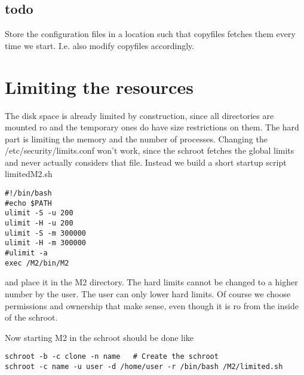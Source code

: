 \documentclass[a4paper]{book}
\begin{document}
\subsection{todo}

Store the configuration files in a location such that copyfiles fetches them
every time we start. I.e. also modify copyfiles accordingly.


\section{Limiting the resources}

The disk space is already limited by construction, since all directories are
mounted ro and the temporary ones do have size restrictions on them.  The hard
part is limiting the memory and the number of processes.  Changing the
/etc/security/limits.conf won't work, since the schroot fetches the global
limits and never actually considers that file.  Instead we build a short
startup script limitedM2.sh

\begin{verbatim}
#!/bin/bash
#echo $PATH
ulimit -S -u 200
ulimit -H -u 200
ulimit -S -m 300000
ulimit -H -m 300000
#ulimit -a
exec /M2/bin/M2
\end{verbatim}

and place it in the M2 directory. The hard limits cannot be changed to a higher
number by the user. The user can only lower hard limits. Of course we choose
permissions and ownership that make sense, even though it is ro from the inside
of the schroot.

Now starting M2 in the schroot should be done like

\begin{verbatim}
schroot -b -c clone -n name   # Create the schroot
schroot -c name -u user -d /home/user -r /bin/bash /M2/limited.sh
\end{verbatim}

\end{document}
